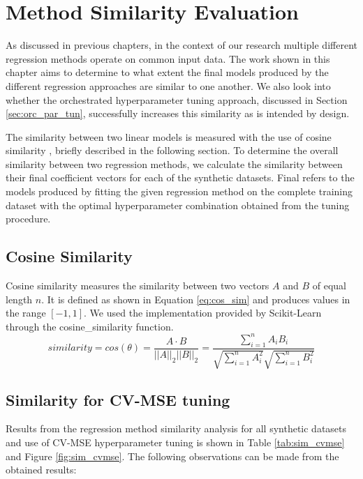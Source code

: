 \chapter{Method Similarity Evaluation}
As discussed in previous chapters, in the context of our research multiple different regression methods operate on common input data. The work shown in this chapter aims to determine to what extent the final models produced by the different regression approaches are similar to one another. We also look into whether the orchestrated hyperparameter tuning approach, discussed in Section \ref{sec:orc_par_tun}, successfully increases this similarity as is intended by design.

The similarity between two linear models is measured with the use of cosine similarity \cite{manning2008introduction}, briefly described in the following section. To determine the overall similarity between two regression methods, we calculate the similarity between their final coefficient vectors for each of the synthetic datasets. Final refers to the models produced by fitting the given regression method on the complete training dataset with the optimal hyperparameter combination obtained from the tuning procedure.


\section{Cosine Similarity}
Cosine similarity measures the similarity between two vectors $A$ and $B$ of equal length $n$. It is defined as shown in Equation \ref{eq:cos_sim} and produces values in the range $[-1,1]$. We used the implementation provided by Scikit-Learn through the cosine\_similarity function.
\begin{equation} \label{eq:cos_sim}
similarity = cos(\theta) = \frac{A \cdot B}{||A||_2||B||_2} = \frac{\sum_{i=1}^{n}A_iB_i}{\sqrt{\sum_{i=1}^{n}A_i^2}\sqrt{\sum_{i=1}^{n}B_i^2}}
\end{equation}


\section{Similarity for CV-MSE tuning} \label{sec:sim_cvmse}
Results from the regression method similarity analysis for all synthetic datasets and use of CV-MSE hyperparameter tuning is shown in Table \ref{tab:sim_cvmse} and Figure \ref{fig:sim_cvmse}. The following observations can be made from the obtained results:

